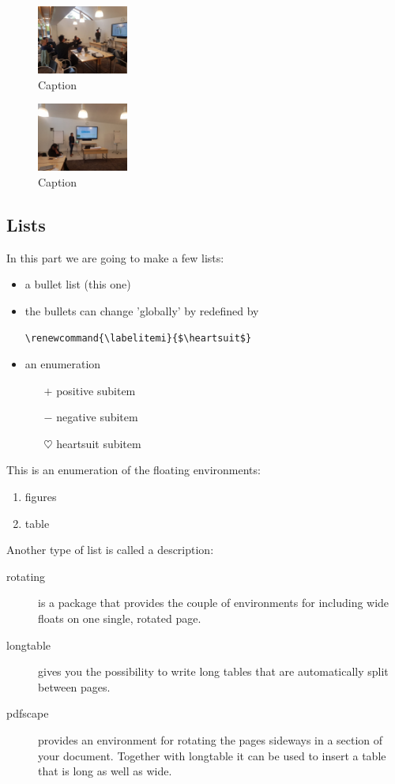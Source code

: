 \begin{figure}
    \centering
    \includegraphics[width=3cm]{photo1.jpg}
    \caption{Caption}
    \label{fig:picture1}
\end{figure}

\begin{figure}
    \centering
    \includegraphics[width=3cm]{photo2.jpg}
    \caption{Caption}
    \label{fig:picture2}
\end{figure}

\subsection{Lists}

In this part we are going to make a few lists:
\begin{itemize}
    \item a bullet list (this one)
    \item the bullets can change 'globally' by redefined by
    
    \verb|\renewcommand{\labelitemi}{$\heartsuit$}|
    \item an enumeration
    \begin{itemize}
        \item[$+$] positive subitem
        \item[$-$] negative subitem
        \item[$\heartsuit$] heartsuit subitem
    \end{itemize}
\end{itemize}

This is an enumeration of the floating environments:
\begin{enumerate}
    \item figures
    \item table
\end{enumerate}

Another type of list is called a description:
\begin{description}
\item[rotating]
is a package that provides the couple of environments for including wide floats on one single, rotated page.
\item[longtable]
gives you the possibility to write long tables that are automatically split between pages.
\item[pdfscape]
provides an environment for rotating the pages sideways in a section of your document. Together with longtable it can be used to insert a table that is long as well as wide.
\end{description}

